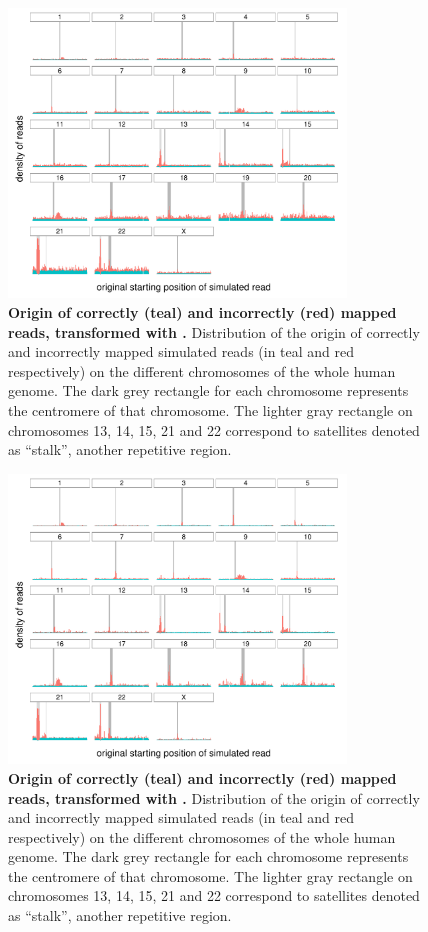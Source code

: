 \documentclass[
  11pt,
  twoside,
  BCOR=10mm,
  listof=totoc]{scrbook}
\newcommand{\extcaption}[2]{
    \caption[#1]{
        \textbf{#1}\newline
        #2
    }
}
\begin{document}
\begin{figure}[H]
    \centering
    \includegraphics[width=0.8\textwidth]{figures/HPC-MSRs/msr_e_distrib.centro.pdf}
    \extcaption{Origin of correctly (teal) and incorrectly (red) mapped reads, transformed with \msr{E}.}{Distribution of the origin of correctly and incorrectly mapped simulated reads (in teal and red respectively) on the different chromosomes of the whole human genome. The dark grey rectangle for each chromosome represents the centromere of that chromosome. The lighter gray rectangle on chromosomes 13, 14, 15, 21 and 22 correspond to satellites denoted as ``stalk'', another repetitive region.}
    \label{fig:hist-msr-e}
\end{figure}

\begin{figure}[H]
    \centering
    \includegraphics[width=0.8\textwidth]{figures/HPC-MSRs/msr_p_distrib.centro.pdf}
    \extcaption{Origin of correctly (teal) and incorrectly (red) mapped reads, transformed with \msr{P}.}{Distribution of the origin of correctly and incorrectly mapped simulated reads (in teal and red respectively) on the different chromosomes of the whole human genome. The dark grey rectangle for each chromosome represents the centromere of that chromosome. The lighter gray rectangle on chromosomes 13, 14, 15, 21 and 22 correspond to satellites denoted as ``stalk'', another repetitive region.}
    \label{fig:hist-msr-p}
\end{figure}
\end{document}

